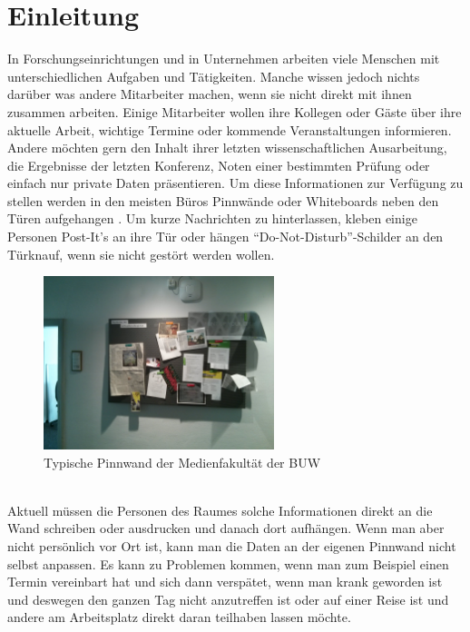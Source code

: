 \chapter{Einleitung}\label{Einleitung}
In Forschungseinrichtungen und in Unternehmen arbeiten viele Menschen mit unterschiedlichen Aufgaben und Tätigkeiten.
Manche wissen jedoch nichts darüber was andere Mitarbeiter machen, wenn sie nicht direkt mit ihnen zusammen arbeiten.
Einige Mitarbeiter wollen ihre Kollegen oder Gäste über ihre aktuelle Arbeit, wichtige Termine oder kommende Veranstaltungen informieren.
Andere möchten gern den Inhalt ihrer letzten wissenschaftlichen Ausarbeitung, die Ergebnisse der letzten Konferenz, Noten einer bestimmten Prüfung oder einfach nur private Daten präsentieren.
Um diese Informationen zur Verfügung zu stellen werden in den meisten Büros Pinnwände oder Whiteboards neben den Türen aufgehangen . Um kurze Nachrichten zu hinterlassen, kleben einige Personen Post-It's an ihre Tür oder hängen ``Do-Not-Disturb''-Schilder an den Türknauf, wenn sie nicht gestört werden wollen.
\\
\begin{figure}[h!]
  \centering
    \includegraphics[width=0.6\textwidth]{./img/pinnwand.jpg}
  \caption{Typische Pinnwand der Medienfakultät der BUW}
  \label{img:pinnwand}
\end{figure}
\\
Aktuell müssen die Personen des Raumes solche Informationen direkt an die Wand schreiben oder ausdrucken und danach dort aufhängen.
Wenn man aber nicht persönlich vor Ort ist, kann man die Daten an der eigenen Pinnwand nicht selbst anpassen.
Es kann zu Problemen kommen, wenn man zum Beispiel einen Termin vereinbart hat und sich dann verspätet, wenn man krank geworden ist und deswegen den ganzen Tag nicht anzutreffen ist oder auf einer Reise ist und andere am Arbeitsplatz direkt daran teilhaben lassen möchte.
\\
